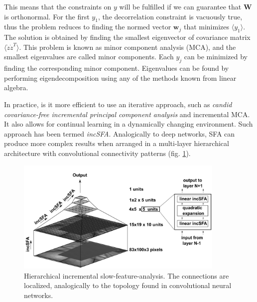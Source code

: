 \documentclass[12pt]{article}
\begin{document}
This means that the constraints on $y$ will be fulfilled if we can guarantee that $\boldsymbol{W}$ is orthonormal.  For the first $y_1$, the decorrelation constraint is vacuously true, thus the problem reduces to finding the normed  vector $\boldsymbol{w}_j$ that minimizes $\langle y_1 \rangle$. The solution is obtained by finding the smallest eigenvector of covariance matrix $\langle \dot{z} \dot{z}^T \rangle$. This problem is known as minor component analysis (MCA), and the smallest eigenvalues are called minor components. Each $y_j$ can be minimized by finding the corresponding minor component. Eigenvalues can be found by performing eigendecomposition using any of the methods known from linear algebra. 

In practice, is it more efficient to use an iterative approach, such as \textit{candid covariance-free incremental principal component analysis} and incremental MCA. It also allows for continual learning in a dynamically changing environment. Such approach has been termed \textit{incSFA}. Analogically to deep networks, SFA can produce more complex results when arranged in a multi-layer hierarchical architecture with convolutional connectivity patterns (fig. \ref{fig:inc_sfa_hierarchy}).
\begin{figure}[!htbp]
	\centering
	\includegraphics[width=10cm]{inc_sfa_hierarchy}
	\caption{Hierarchical incremental slow-feature-analysis. The connections are localized, analogically to the topology found in convolutional neural networks.}
	\label{fig:inc_sfa_hierarchy}
\end{figure}
\end{document}
